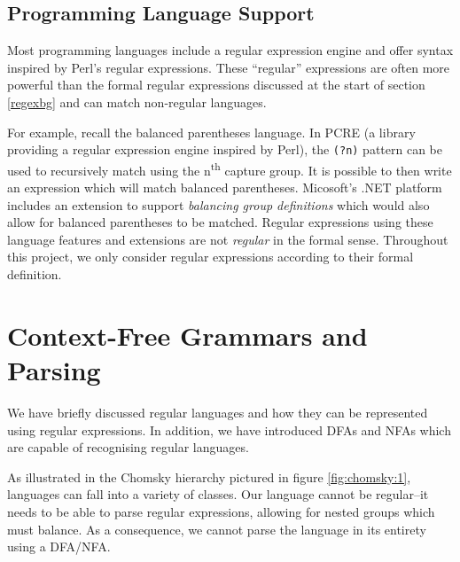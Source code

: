 \documentclass[a4paper,openany,12pt]{book}
\begin{document}
\subsection{Programming Language Support}
\label{sec:pls}
Most programming languages include a regular expression engine and offer syntax inspired by Perl's regular expressions.
These ``regular'' expressions are often more powerful than the formal regular expressions discussed at the start of
section \ref{regexbg} and can match non-regular languages.

For example, recall the balanced parentheses language.
In PCRE (a library providing a regular expression engine inspired by Perl), the \texttt{(?n)} pattern can be used to
recursively match using the n\textsuperscript{th} capture group.
It is possible to then write an expression which will match balanced parentheses.
Micosoft's .NET platform includes an extension to support \emph{balancing group definitions} which would also allow for
balanced parentheses to be matched.
Regular expressions using these language features and extensions are not \emph{regular} in the formal sense.
Throughout this project, we only consider regular expressions according to their formal definition.

\section{Context-Free Grammars and Parsing}

We have briefly discussed regular languages and how they can be represented using regular expressions.
In addition, we have introduced DFAs and NFAs which are capable of recognising regular languages.

As illustrated in the Chomsky hierarchy pictured in figure \ref{fig:chomsky:1}, languages can fall into a variety of
classes.
Our language cannot be regular--it needs to be able to parse regular expressions, allowing for nested groups which must
balance.
As a consequence, we cannot parse the language in its entirety using a DFA/NFA.
\end{document}
